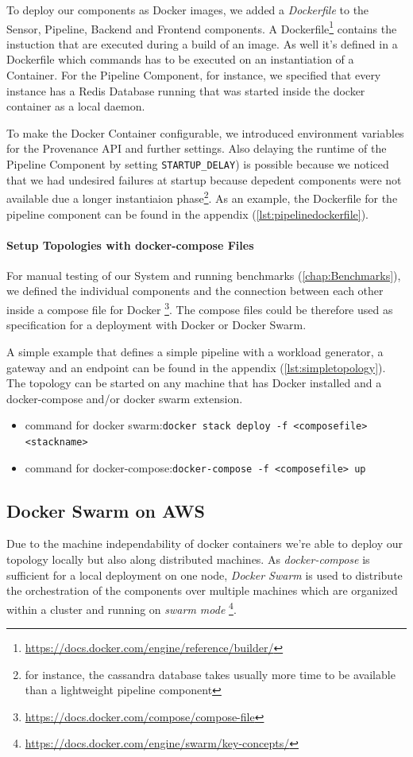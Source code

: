 To deploy our components as Docker images, we added a \emph{Dockerfile} to the Sensor, Pipeline, Backend and Frontend components. A Dockerfile\footnote{\url{https://docs.docker.com/engine/reference/builder/}} contains the instuction that are executed during a build of an image. As well it's defined in a Dockerfile which commands has to be executed on an instantiation of a Container. For the Pipeline Component, for instance, we specified that every instance has a Redis Database running that was started inside the docker container as a local daemon.

To make the Docker Container configurable, we introduced environment variables for the Provenance API and further settings. Also delaying the runtime of the Pipeline Component by setting \texttt{STARTUP\_DELAY}) is possible because we noticed that we had undesired failures at startup because depedent components were not available due a longer instantiaion phase\footnote{for instance, the cassandra database takes usually more time to be available than a lightweight pipeline component}. As an example, the Dockerfile for the pipeline component can be found in the appendix (\ref{lst:pipelinedockerfile}).

\paragraph*{Setup Topologies with docker-compose Files} 
For manual testing of our System and running benchmarks (\ref{chap:Benchmarks}), we defined the individual components and the connection between each other inside a compose file for Docker \footnote{\url{https://docs.docker.com/compose/compose-file}}. The compose files could be therefore used as specification for a deployment with Docker or Docker Swarm.

A simple example that defines a simple pipeline with a workload generator, a gateway and an endpoint can be found in the appendix (\ref{lst:simpletopology}).
The topology can be started on any machine that has Docker installed and a docker-compose and/or docker swarm extension.

\begin{itemize}
	\item command for docker swarm:\texttt{docker stack deploy -f <composefile> <stackname> }
	\item command for docker-compose:\texttt{docker-compose -f <composefile> up} 
\end{itemize}


\subsection{Docker Swarm on AWS}
Due to the machine independability of docker containers we're able to deploy our topology locally but also along distributed machines.
As \emph{docker-compose} is sufficient for a local deployment on one node, \emph{Docker Swarm} is used to distribute the orchestration of the components over multiple machines which are organized within a cluster and running on \emph{swarm mode} \footnote{\url{https://docs.docker.com/engine/swarm/key-concepts/}}.

